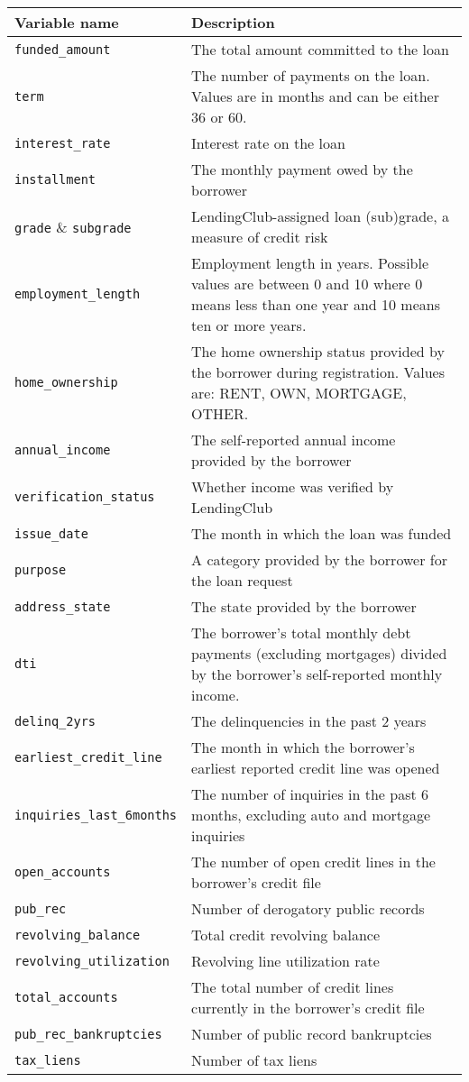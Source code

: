 \begin{table}[!ht]
\footnotesize
\centering

\begin{tabular}{p{5cm}p{10cm}}
\toprule
\textbf{Variable name} & \textbf{Description} \\ \midrule
\texttt{funded\_amount} & The total amount committed to the loan \\
\texttt{term} & The number of payments on the loan. Values are in months and can be either 36 or 60. \\
\texttt{interest\_rate} & Interest rate on the loan \\
\texttt{installment} & The monthly payment owed by the borrower \\
\texttt{grade} \& \texttt{subgrade} & LendingClub-assigned loan (sub)grade, a measure of credit risk \\
\texttt{employment\_length} & Employment length in years. Possible values are between 0 and 10 where 0 means less than one year and 10 means ten or more years. \\
\texttt{home\_ownership} & The home ownership status provided by the borrower during registration. Values are: RENT, OWN, MORTGAGE, OTHER. \\
\texttt{annual\_income} & The self-reported annual income provided by the borrower \\ 
\texttt{verification\_status} & Whether income was verified by LendingClub \\
\texttt{issue\_date} & The month in which the loan was funded \\
\texttt{purpose} & A category provided by the borrower for the loan request \\
\texttt{address\_state} & The state provided by the borrower \\
\texttt{dti} & The borrower's total monthly debt payments (excluding mortgages) divided by the borrower's self-reported monthly income. \\
\texttt{delinq\_2yrs} & The delinquencies in the past 2 years \\
\texttt{earliest\_credit\_line} & The month in which the borrower's earliest reported credit line was opened \\
\texttt{inquiries\_last\_6months} & The number of inquiries in the past 6 months, excluding auto and mortgage inquiries \\
\texttt{open\_accounts} & The number of open credit lines in the borrower's credit file \\
\texttt{pub\_rec} & Number of derogatory public records \\
\texttt{revolving\_balance} & Total credit revolving balance \\
\texttt{revolving\_utilization} & Revolving line utilization rate \\
\texttt{total\_accounts} & The total number of credit lines currently in the borrower's credit file \\
\texttt{pub\_rec\_bankruptcies} & Number of public record bankruptcies \\
\texttt{tax\_liens} & Number of tax liens \\


\end{tabular}
\end{table}
